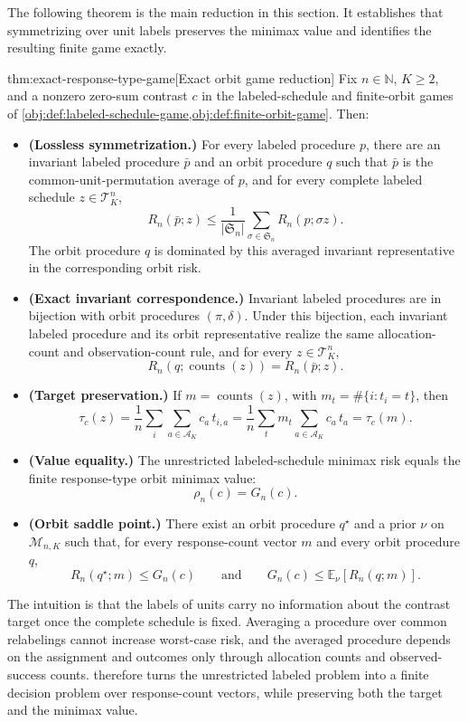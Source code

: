 The following theorem is the main reduction in this section. It establishes that symmetrizing over unit labels preserves the minimax value and identifies the resulting finite game exactly.

\begin{theoremv}{thm:exact-response-type-game}[Exact orbit game reduction]
Fix \(n\in\mathbb N\), \(K\ge 2\), and a nonzero zero-sum contrast \(c\) in the labeled-schedule and finite-orbit games of \cref{obj:def:labeled-schedule-game,obj:def:finite-orbit-game}. Then:
\begin{itemize}
\item \textbf{(Lossless symmetrization.)} For every labeled procedure \(p\), there are an invariant labeled procedure \(\bar p\) and an orbit procedure \(q\) such that \(\bar p\) is the common-unit-permutation average of \(p\), and for every complete labeled schedule \(z\in\mathcal T_K^n\),
\[
R_n(\bar p;z)
\le
\frac{1}{|\mathfrak S_n|}
\sum_{\sigma\in\mathfrak S_n} R_n(p;\sigma z).
\]
The orbit procedure \(q\) is dominated by this averaged invariant representative in the corresponding orbit risk.
\item \textbf{(Exact invariant correspondence.)} Invariant labeled procedures are in bijection with orbit procedures \((\pi,\delta)\). Under this bijection, each invariant labeled procedure and its orbit representative realize the same allocation-count and observation-count rule, and for every \(z\in\mathcal T_K^n\),
\[
R_n(q;\operatorname{counts}(z))=R_n(\bar p;z).
\]
\item \textbf{(Target preservation.)} If \(m=\operatorname{counts}(z)\), with \(m_t=\#\{i:t_i=t\}\), then
\[
\tau_c(z)
=
\frac{1}{n}\sum_i\sum_{a\in\mathcal A_K} c_a\,t_{i,a}
=
\frac{1}{n}\sum_t m_t\sum_{a\in\mathcal A_K} c_a\,t_a
=
\tau_c(m).
\]
\item \textbf{(Value equality.)} The unrestricted labeled-schedule minimax risk equals the finite response-type orbit minimax value:
\[
\rho_n(c)=G_n(c).
\]
\item \textbf{(Orbit saddle point.)} There exist an orbit procedure \(q^\star\) and a prior \(\nu\) on \(\mathcal M_{n,K}\) such that, for every response-count vector \(m\) and every orbit procedure \(q\),
\[
R_n(q^\star;m)\le G_n(c)
\qquad\text{and}\qquad
G_n(c)\le \mathbb E_{\nu}\!\left[R_n(q;m)\right].
\]
\end{itemize}
\end{theoremv}

The intuition is that the labels of units carry no information about the contrast target once the complete schedule is fixed. Averaging a procedure over common relabelings cannot increase worst-case risk, and the averaged procedure depends on the assignment and outcomes only through allocation counts and observed-success counts.  therefore turns the unrestricted labeled problem into a finite decision problem over response-count vectors, while preserving both the target and the minimax value.

